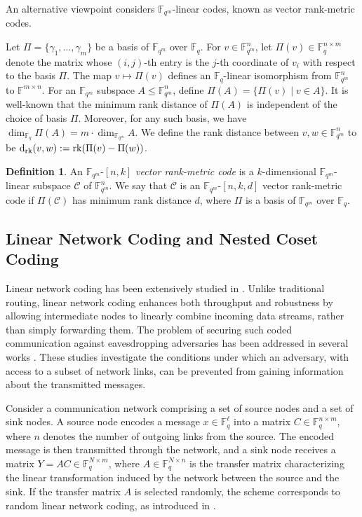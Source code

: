 \documentclass[onecolumn,draftclsnofoot,12pt]{IEEEtran}
\newcommand{\F}{\mathbb{F}}
\newcommand{\rk}{\mathrm{rk}}
\theoremstyle{plain} %
\theoremstyle{definition}
\newtheorem{definition}[theorem]{Definition}
\begin{document}
An alternative viewpoint considers $\mathbb{F}_{q^m}$-linear codes, known as vector rank-metric codes.

Let $\Pi = \{\gamma_1, \ldots, \gamma_m\}$ be a basis of $\mathbb{F}_{q^m}$ over $\mathbb{F}_q$. For $v \in \mathbb{F}_{q^m}^n$, let $\Pi(v) \in \mathbb{F}_q^{n \times m}$ denote the matrix whose $(i, j)$-th entry is the $j$-th coordinate of $v_i$ with respect to the basis $\Pi$. The map 
$v \mapsto \Pi(v)$ defines an $\mathbb{F}_q$-linear isomorphism from 
$ \mathbb{F}_{q^m}^n$ to $\mathbb{F}^{m\times n}$. For an 
$\mathbb{F}_{q^m}$ subspace $A \leq \mathbb{F}_{q^m}^n$, define $\Pi(A) = \{ \Pi(v) \mid v \in A \}$. It is well-known that the minimum rank distance of 
    $\Pi(A)$ is independent of the choice of basis $\Pi$. Moreover, for any such basis, we have
    $
    \dim_{\mathbb{F}_q} \Pi(A) = m \cdot \dim_{\mathbb{F}_{q^m}} A.
    $
We define the rank distance between $v,w \in  \mathbb{F}_{q^m}^n$ to be $\textup{d}_\rk(v,w):=\rk(\Pi(v)-\Pi(w))$.



\begin{definition}
    An $\mathbb{F}_{q^m}$-$[n,k]$ \emph{vector rank-metric code} is a 
    $k$-dimensional $\mathbb{F}_{q^m}$-linear subspace $\mathcal{C}$ of 
    $\mathbb{F}_{q^m}^n$. We say that $\mathcal{C}$ is an $\mathbb{F}_{q^m}$-$[n,k,d]$ vector rank-metric code if $\Pi(\mathcal{C})$ has minimum rank distance $d$, where $\Pi$ is a basis of $\mathbb{F}_{q^m}$ over $\mathbb{F}_{q}.$ 
\end{definition}


\subsection{Linear Network Coding and Nested Coset Coding}

Linear network coding has been extensively studied in \cite{informationflow,networkcoding,linearnetworkcoding,algebraicapproach}. Unlike traditional routing, linear network coding enhances both throughput and robustness by allowing intermediate nodes to linearly combine incoming data streams, rather than simply forwarding them. The problem of securing such coded communication against eavesdropping adversaries has been addressed in several works \cite{securenetwork,Universal,Emina}. These studies investigate the conditions under which an adversary, with access to a subset of network links, can be prevented from gaining information about the transmitted messages.

Consider a communication network comprising a set of source nodes and a set of sink nodes. A source node encodes a message $x\in \F_q^{\ell}$ into a matrix $C\in \F_q^{n\times m}$, where $n$ denotes the number of outgoing links from the source. The encoded message is then transmitted through the network, and a sink node receives a matrix $Y = AC \in \F_q^{N\times m}$, where $A\in \F_q^{N\times n}$ is the transfer matrix characterizing the linear transformation induced by the network between the source and the sink. If the transfer matrix $A$ is selected randomly, the scheme corresponds to random linear network coding, as introduced in \cite{1705002}.
\end{document}
